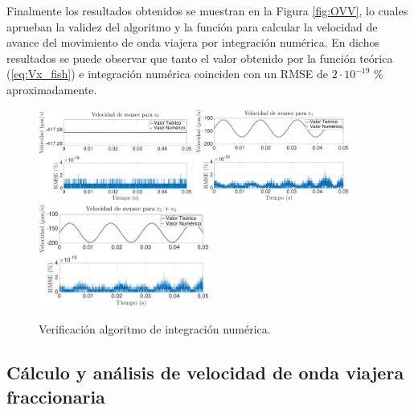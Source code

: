 Finalmente los resultados obtenidos se muestran en la Figura \ref{fig:OVV}, lo cuales aprueban la validez del algoritmo y la función para calcular la velocidad de avance del movimiento de onda viajera por integración numérica. En dichos resultados se puede observar que tanto el valor obtenido por la función teórica (\ref{eq:Vx_fish}) e integración numérica coinciden con un RMSE de $ 2 \cdot 10^{-19}$ \% aproximadamente.
\begin{figure}[t] %
	\vspace*{3mm}
    \centering
    \includegraphics[width=0.45\textwidth]{Figuras/VC0}
    \includegraphics[width=0.45\textwidth]{Figuras/VC1}
    \includegraphics[width=0.5\textwidth]{Figuras/VC2}
  	\caption{Verificación algoritmo de integración numérica.}
  	\label{fig:OVVC}
\end{figure}
\newpage
\subsection{Cálculo y análisis de velocidad de onda viajera fraccionaria} \label{sec:analisis_velocidad}


